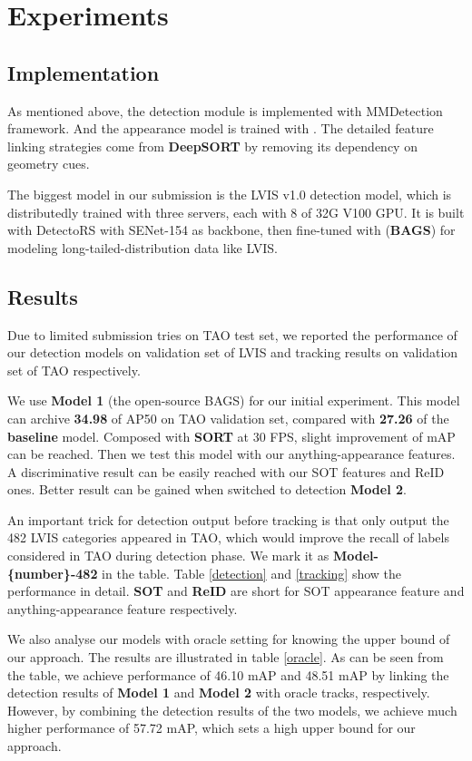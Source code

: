 \documentclass[runningheads]{llncs}
\begin{document}
\section{Experiments}
\subsection{Implementation}
As mentioned above, the detection module is implemented with MMDetection framework. And the appearance model is trained with \cite{luo2019strong}\cite{luo2019bag}. The detailed feature linking strategies come from \textbf{DeepSORT}\cite{Wojke2018deep} by removing its dependency on geometry cues.

The biggest model in our submission is the LVIS v1.0 detection model, which is distributedly trained  with three servers, each with 8 of 32G V100 GPU. It is built with DetectoRS with SENet-154 as backbone, then fine-tuned with (\textbf{BAGS}) for modeling long-tailed-distribution data like LVIS.

\subsection{Results}
Due to limited submission tries on TAO test set, we reported the performance of our detection models on validation set of LVIS and tracking results on validation set of TAO respectively. 

We use \textbf{Model 1} (the open-source BAGS) for our initial experiment. This model can archive \textbf{34.98} of AP50 on TAO validation set, compared with \textbf{27.26} of the \textbf{baseline} model. Composed with \textbf{SORT} at 30 FPS, slight improvement of mAP can be reached. Then we test this model with our anything-appearance features. A discriminative result can be easily reached with our SOT features and ReID ones. Better result can be gained when switched to detection \textbf{Model 2}.

An important trick for detection output before tracking is that only output the 482 LVIS categories appeared in TAO, which would improve the recall of labels considered in TAO during detection phase. We mark it as \textbf{Model-\{number\}-482} in the table. Table \ref{detection} and \ref{tracking} show the performance in detail.
\textbf{SOT} and \textbf{ReID} are short for SOT appearance feature and anything-appearance feature respectively.

We also analyse our models with oracle setting for knowing the upper bound of our approach. The results are illustrated in table \ref{oracle}. As can be seen from the table, we achieve performance of 46.10 mAP and 48.51 mAP by linking the detection results of \textbf{Model 1} and \textbf{Model 2} with oracle tracks, respectively. However, by combining the detection results of the two models, we achieve much higher performance of 57.72 mAP, which sets a high upper bound for our approach. 
\end{document}
